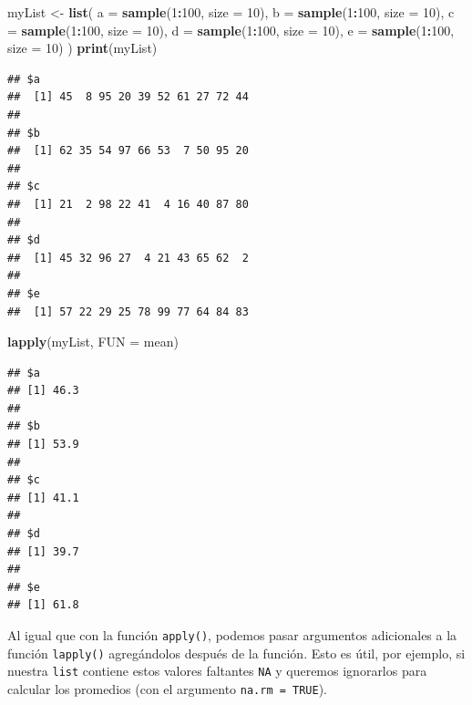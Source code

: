 \documentclass[
]{book}
\newenvironment{Shaded}{\begin{snugshade}}{\end{snugshade}}
\newcommand{\DataTypeTok}[1]{\textcolor[rgb]{0.13,0.29,0.53}{#1}}
\newcommand{\DecValTok}[1]{\textcolor[rgb]{0.00,0.00,0.81}{#1}}
\newcommand{\KeywordTok}[1]{\textcolor[rgb]{0.13,0.29,0.53}{\textbf{#1}}}
\newcommand{\NormalTok}[1]{#1}
\newcommand{\OperatorTok}[1]{\textcolor[rgb]{0.81,0.36,0.00}{\textbf{#1}}}
\newcommand{\StringTok}[1]{\textcolor[rgb]{0.31,0.60,0.02}{#1}}
\begin{document}
\begin{Shaded}
\begin{Highlighting}[]
\NormalTok{myList <-}\StringTok{ }\KeywordTok{list}\NormalTok{(}
  \DataTypeTok{a =} \KeywordTok{sample}\NormalTok{(}\DecValTok{1}\OperatorTok{:}\DecValTok{100}\NormalTok{, }\DataTypeTok{size =} \DecValTok{10}\NormalTok{), }
  \DataTypeTok{b =} \KeywordTok{sample}\NormalTok{(}\DecValTok{1}\OperatorTok{:}\DecValTok{100}\NormalTok{, }\DataTypeTok{size =} \DecValTok{10}\NormalTok{), }
  \DataTypeTok{c =} \KeywordTok{sample}\NormalTok{(}\DecValTok{1}\OperatorTok{:}\DecValTok{100}\NormalTok{, }\DataTypeTok{size =} \DecValTok{10}\NormalTok{), }
  \DataTypeTok{d =} \KeywordTok{sample}\NormalTok{(}\DecValTok{1}\OperatorTok{:}\DecValTok{100}\NormalTok{, }\DataTypeTok{size =} \DecValTok{10}\NormalTok{), }
  \DataTypeTok{e =} \KeywordTok{sample}\NormalTok{(}\DecValTok{1}\OperatorTok{:}\DecValTok{100}\NormalTok{, }\DataTypeTok{size =} \DecValTok{10}\NormalTok{)}
\NormalTok{)}
\KeywordTok{print}\NormalTok{(myList)}
\end{Highlighting}
\end{Shaded}

\begin{verbatim}
## $a
##  [1] 45  8 95 20 39 52 61 27 72 44
## 
## $b
##  [1] 62 35 54 97 66 53  7 50 95 20
## 
## $c
##  [1] 21  2 98 22 41  4 16 40 87 80
## 
## $d
##  [1] 45 32 96 27  4 21 43 65 62  2
## 
## $e
##  [1] 57 22 29 25 78 99 77 64 84 83
\end{verbatim}

\begin{Shaded}
\begin{Highlighting}[]
\KeywordTok{lapply}\NormalTok{(myList, }\DataTypeTok{FUN =}\NormalTok{ mean)}
\end{Highlighting}
\end{Shaded}

\begin{verbatim}
## $a
## [1] 46.3
## 
## $b
## [1] 53.9
## 
## $c
## [1] 41.1
## 
## $d
## [1] 39.7
## 
## $e
## [1] 61.8
\end{verbatim}

Al igual que con la función \texttt{apply()}, podemos pasar argumentos adicionales a la función \texttt{lapply()} agregándolos después de la función. Esto es útil, por ejemplo, si nuestra \texttt{list} contiene estos valores faltantes \texttt{NA} y queremos ignorarlos para calcular los promedios (con el argumento \texttt{na.rm\ =\ TRUE}).
\end{document}
